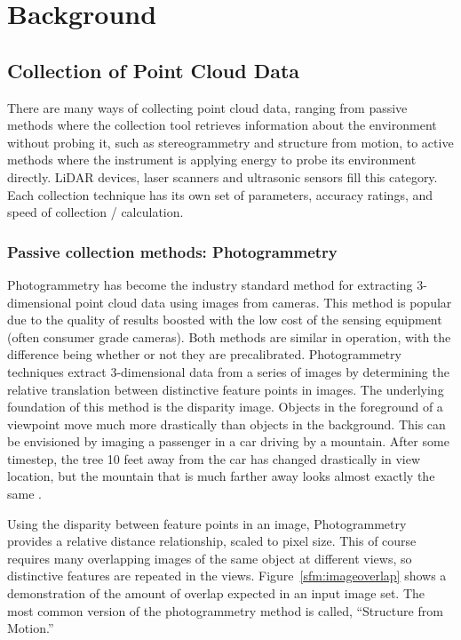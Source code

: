 \documentclass[12pt]{drexelthesis}
\let\Oldsection\section
\renewcommand{\section}{\FloatBarrier\Oldsection}
\let\Oldsubsection\subsection
\renewcommand{\subsection}{\FloatBarrier\Oldsubsection}
\begin{document}
\chapter{Background}
\label{chap:background}
\section{Collection of Point Cloud Data}
\label{sec:PCcollection}
There are many ways of collecting point cloud data, ranging from passive methods where the collection tool retrieves information about the environment without probing it, such as stereogrammetry and structure from motion, to active methods where the instrument is applying energy to probe its environment directly. LiDAR devices, laser scanners and ultrasonic sensors fill this category. Each collection technique has its own set of parameters, accuracy ratings, and speed of collection / calculation.

\subsection{Passive collection methods: Photogrammetry}
\label{subsec:passive}
Photogrammetry has become the industry standard method for extracting 3-dimensional point cloud data using images from cameras. This method is popular due to the quality of results boosted with the low cost of the sensing equipment (often consumer grade cameras). Both methods are similar in operation, with the difference being whether or not they are precalibrated. Photogrammetry techniques extract 3-dimensional data from a series of images by determining the relative translation between distinctive feature points in images. The underlying foundation of this method is the disparity image. Objects in the foreground of a viewpoint move much more drastically than objects in the background. This can be envisioned by imaging a passenger in a car driving by a mountain. After some timestep, the tree 10 feet away from the car has changed drastically in view location, but the mountain that is much farther away looks almost exactly the same \cite{RN20}.

Using the disparity between feature points in an image, Photogrammetry provides a relative distance relationship, scaled to pixel size. This of course requires many overlapping images of the same object at different views, so distinctive features are repeated in the views. Figure~\ref{sfm:imageoverlap} shows a demonstration of the amount of overlap expected in an input image set. The most common version of the photogrammetry method is called, ``Structure from Motion.''
\end{document}

